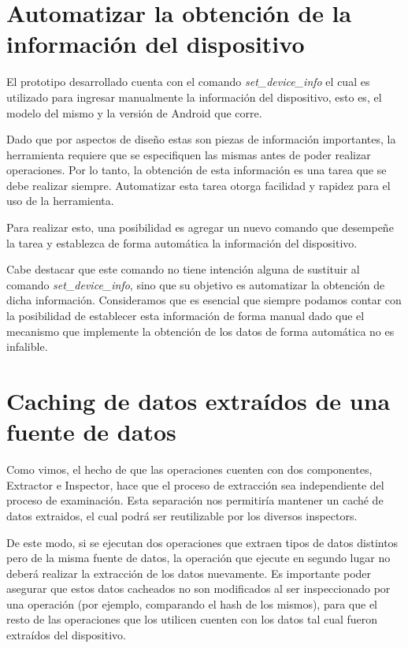 \section{Automatizar la obtención de la información del dispositivo}
El prototipo desarrollado cuenta con el comando \emph{set\_device\_info} el cual es utilizado para ingresar manualmente la información del dispositivo, esto es, el modelo del mismo y la versión de Android que corre.

Dado que por aspectos de diseño estas son piezas de información importantes, la herramienta requiere que se especifiquen las mismas antes de poder realizar operaciones. Por lo tanto, la obtención de esta información es una tarea que se debe realizar siempre. Automatizar esta tarea otorga facilidad y rapidez para el uso de la herramienta.

Para realizar esto, una posibilidad es agregar un nuevo comando que desempeñe la tarea y establezca de forma automática la información del dispositivo.

Cabe destacar que este comando no tiene intención alguna de sustituir al comando \emph{set\_device\_info}, sino que su objetivo es automatizar la obtención de dicha información. Consideramos que es esencial que siempre podamos contar con la posibilidad de establecer esta información de forma manual dado que el mecanismo que implemente la obtención de los datos de forma automática no es infalible.

\section{Caching de datos extraídos de una fuente de datos}
Como vimos, el hecho de que las operaciones cuenten con dos componentes, Extractor e Inspector, hace que el proceso de extracción sea independiente del proceso de examinación. Esta separación nos permitiría mantener un caché de datos extraidos, el cual podrá ser reutilizable por los diversos inspectors. 

De este modo, si se ejecutan dos operaciones que extraen tipos de datos distintos pero de la misma fuente de datos, la operación que ejecute en segundo lugar no deberá realizar la extracción de los datos nuevamente. Es importante poder asegurar que estos datos cacheados no son modificados al ser inspeccionado por una operación (por ejemplo, comparando el hash de los mismos), para que el resto de las operaciones que los utilicen cuenten con los datos tal cual fueron extraídos del dispositivo.

